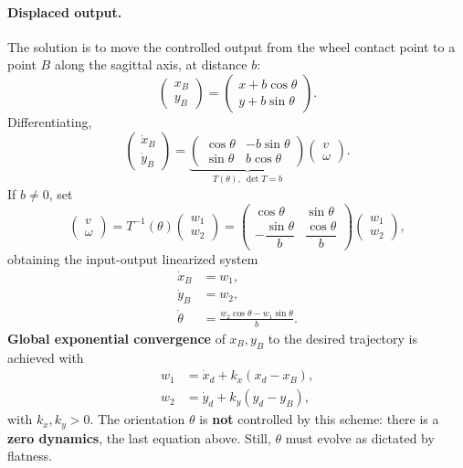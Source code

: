 \paragraph{Displaced output.}
The solution is to move the controlled output from the wheel contact
point to a point \( B \) along the sagittal axis, at distance \( b \):
\[
\begin{pmatrix} x_B \\ y_B \end{pmatrix}
=
\begin{pmatrix}
    x + b \cos\theta \\
    y + b \sin\theta
\end{pmatrix}.
\]
Differentiating,
\[
\begin{pmatrix} \dot{x}_B \\ \dot{y}_B \end{pmatrix}
=
\underbrace{
\begin{pmatrix}
    \cos\theta & -b \sin\theta \\
    \sin\theta & b \cos\theta
\end{pmatrix}}_{T(\theta),\ \det T = b}
\begin{pmatrix} v \\ \omega \end{pmatrix}.
\]
If \( b \neq 0 \), set
\[
\begin{pmatrix} v \\ \omega \end{pmatrix}
= T^{-1}(\theta)
  \begin{pmatrix} w_1 \\ w_2 \end{pmatrix}
=
\begin{pmatrix}
    \cos\theta & \sin\theta \\
    -\dfrac{\sin\theta}{b} & \dfrac{\cos\theta}{b}
\end{pmatrix}
\begin{pmatrix} w_1 \\ w_2 \end{pmatrix},
\]
obtaining the input-output linearized system
\begin{align}
    \dot{x}_B &= w_1, \\
    \dot{y}_B &= w_2, \\
    \dot{\theta} &= \frac{w_2 \cos\theta - w_1 \sin\theta}{b}.
\end{align}
\textbf{Global exponential convergence} of \( x_B, y_B \) to the
desired trajectory is achieved with
\begin{align}
    w_1 &= \dot{x}_d + k_x (x_d - x_B), \\
    w_2 &= \dot{y}_d + k_y (y_d - y_B),
\end{align}
with \( k_x, k_y > 0 \). The orientation \( \theta \) is \textbf{not}
controlled by this scheme: there is a \textbf{zero dynamics}, the last
equation above. Still, \( \theta \) must evolve as dictated by
flatness.

